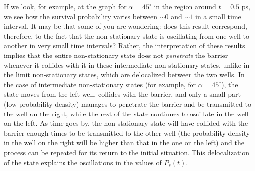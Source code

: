\documentclass[12pt, a4paper]{article}
\begin{document}
\begin{enumerate}[label=\textbf{Slide \arabic*.}]
        If we look, for example, at the graph for $\alpha = 45^{\circ}$ in the region around $t = 0.5$ ps, we see how the survival probability varies between $\sim 0$ and $ \sim 1$ in a small time interval. It may be that some of you are wondering: does this result correspond, therefore, to the fact that the non-stationary state is oscillating from one well to another in very small time intervals? Rather, the interpretation of these results implies that the entire non-stationary state does not \textit{penetrate} the barrier whenever it collides with it in these intermediate non-stationary states, unlike in the limit non-stationary states, which are delocalized between the two wells. In the case of intermediate non-stationary states (for example, for $\alpha = 45^{\circ}$), the state moves from the left well, collides with the barrier, and only a small part (low probability density) manages to penetrate the barrier and be transmitted to the well on the right, while the rest of the state continues to oscillate in the well on the left. As time goes by, the non-stationary state will have collided with the barrier enough times to be transmitted to the other well (the probability density in the well on the right will be higher than that in the one on the left) and the process can be repeated for its return to the initial situation. This delocalization of the state explains the oscillations in the values of $P_s(t)$.


\end{enumerate}
\end{document}
